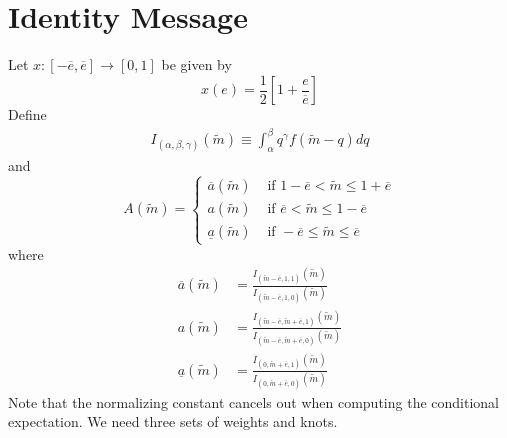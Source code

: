 \documentclass{article}
\begin{document}
\section{Identity Message}
\noindent Let $x:[-\overline{e},\overline{e}]\rightarrow[0,1]$ be given by
\begin{equation}
	x(e)=\frac{1}{2}\left[1+\frac{e}{\overline{e}}\right]
\end{equation}
Define
\begin{align}
	I_{(\alpha,\beta,\gamma)}(\widetilde{m})\equiv\int_{\alpha}^{\beta}{q^{\gamma}f(\tilde{m}-q)dq}
\end{align}
and
\begin{equation}
	A(\widetilde{m})=
	\begin{cases}
		\overline{a}(\widetilde{m}) & \text{ if } 1-\overline{e}<\widetilde{m}\leq 1+\overline{e}\\
		a(\widetilde{m}) & \text{ if } \overline{e}<\widetilde{m}\leq 1-\overline{e}\\
		\underline{a}(\widetilde{m}) & \text{ if } -\overline{e}\leq\widetilde{m}\leq \overline{e}
	\end{cases}
\end{equation}
where
\begin{align}
	\overline{a}(\widetilde{m})&=\frac{I_{(\widetilde{m}-\bar{e},1,1)}(\widetilde{m})}{I_{(\widetilde{m}-\bar{e},1,0)}(\widetilde{m})}\\
	a(\widetilde{m})&=\frac{I_{(\widetilde{m}-\bar{e},\widetilde{m}+\bar{e},1)}(\widetilde{m})}{I_{(\widetilde{m}-\bar{e},\widetilde{m}+\bar{e},0)}(\widetilde{m})}\\
	\underline{a}(\widetilde{m})&=\frac{I_{(0,\widetilde{m}+\bar{e},1)}(\widetilde{m})}{I_{(0,\widetilde{m}+\bar{e},0)}(\widetilde{m})}
\end{align}
Note that the normalizing constant cancels out when computing the conditional expectation. We need three sets of weights and knots. 
\end{document}
